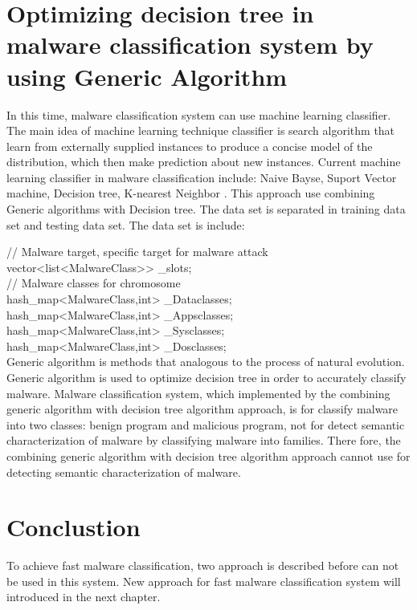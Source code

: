 \section{Optimizing decision tree in malware classification system by using Generic Algorithm}
In this time, malware classification system can use machine learning classifier. The main idea of machine learning technique classifier is search algorithm that learn from externally supplied instances to produce a concise model of the distribution, which then  make prediction about new  instances. Current machine learning classifier in malware classification include: Naive Bayse, Suport Vector machine, Decision tree, K-nearest Neighbor \cite{mohd}. This approach use combining Generic algorithms with Decision tree. The data set is separated in training data set and testing data set. The data set is include:

// Malware target, specific target for malware attack\\
vector<list<MalwareClass\*>> \_slots;\\
// Malware classes for chromosome\\
hash\_map<MalwareClass\*,int> \_Dataclasses;\\
hash\_map<MalwareClass\*,int> \_Appsclasses;\\
hash\_map<MalwareClass\*,int> \_Sysclasses;\\
hash\_map<MalwareClass\*,int> \_Dosclasses;\\

Generic algorithm is methods that analogous to the process of natural evolution. Generic algorithm is used to optimize decision tree in order to accurately classify malware. Malware classification system, which implemented by the combining generic algorithm with decision tree algorithm approach, is for classify malware into two classes: benign program and malicious program, not for detect semantic characterization of malware by classifying malware into families. There fore, the combining generic algorithm with decision tree algorithm approach cannot use for detecting semantic characterization of malware.
\section{Conclustion}
To achieve fast malware classification, two approach is described before can not be used in this system. New approach for fast malware classification system will introduced in the next chapter. 
